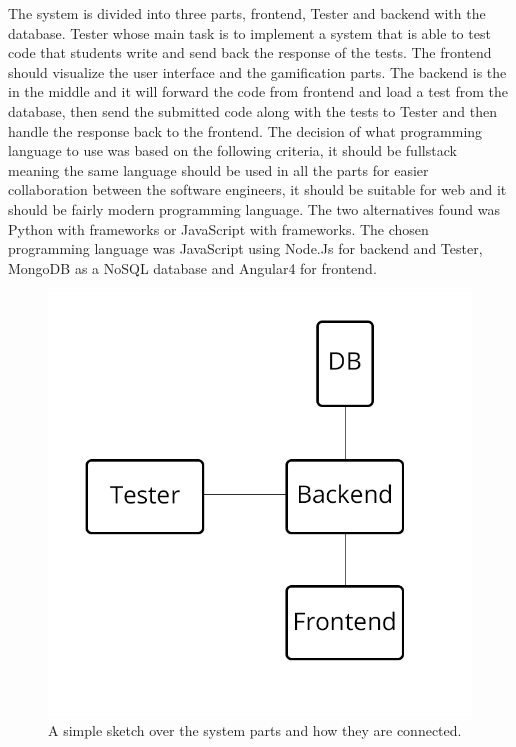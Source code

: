 
The system is divided into three parts, frontend, Tester and backend with the database. Tester whose main task is to implement a system that is able to test code that students write and send back the response of the tests. The frontend should visualize the user interface and the gamification parts. The backend is the in the middle and it will forward the code from frontend and load a test from the database, then send the submitted code along with the tests to Tester and then handle the response back to the frontend. The decision of what programming language to use was based on the following criteria, it should be fullstack meaning the same language should be used in all the parts for easier collaboration between the software engineers, it should be suitable for web and it should be fairly modern programming language. The two alternatives found was Python with frameworks or JavaScript with frameworks. The chosen programming language was JavaScript using Node.Js for backend and Tester, MongoDB
as a NoSQL database and Angular4 for frontend.

\begin{figure}[H]
\centering
\includegraphics[scale=0.4]{img/SystemA2.png}
\caption{A simple sketch over the system parts and how they are connected.}
\end{figure}